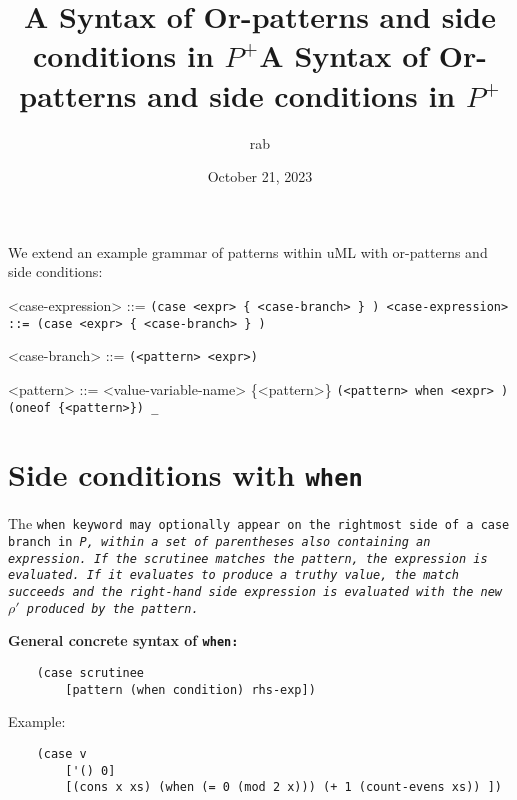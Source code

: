 \documentclass[]{article}
\title{A Syntax of Or-patterns and side conditions in $P^{+}$}
\title{A Syntax of Or-patterns and side conditions in $P^{+}$}
\author{rab}
\date{October 21, 2023}
\begin{document}
\maketitle


We extend an example grammar of patterns within uML with 
or-patterns and side conditions: 

\bigskip

\begin{grammar}
    <case-expression> ::= \tt{(case} <expr> \{ <case-branch> \} \tt{)}
    <case-expression> ::= \tt{(case} <expr> \{ <case-branch> \} \tt{)}
    
    <case-branch> ::= \tt{(}<pattern> <expr>\tt{)}
    
    <pattern> ::= <value-variable-name>
     \{<pattern>\}
    \alt \tt{(}<pattern> \tt{when} <expr> \tt{)} 
    \alt \tt{(oneof} \{<pattern>\}\tt{)}
    \alt \tt{_}
    
\end{grammar}

\bigskip

\section{Side conditions with \tt{when}}

The \tt{when} keyword may optionally appear on the rightmost side of a \tt{case}
branch in \it{P}, within a set of parentheses also containing an expression.
If the scrutinee matches the pattern, the expression is evaluated. If it 
evaluates to produce a truthy value, the match succeeds and the right-hand
side expression is evaluated with the new $\rho'$ produced by the pattern.

\medskip

\bf{General concrete syntax of \tt{when}: }

\begin{verbatim}
    (case scrutinee
        [pattern (when condition) rhs-exp])
\end{verbatim}


Example: 
\begin{verbatim}
    (case v
        ['() 0]
        [(cons x xs) (when (= 0 (mod 2 x))) (+ 1 (count-evens xs)) ])
\end{verbatim}


\end{document}
